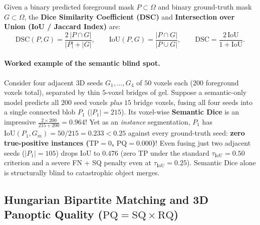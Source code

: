 \documentclass[10pt,a4paper]{article}
\renewcommand{\_}{\origunderscore\allowbreak}
\begin{document}
Given a binary predicted foreground mask $P \subset \Omega$ and binary ground-truth mask $G \subset \Omega$, the \textbf{Dice Similarity Coefficient (DSC)} and \textbf{Intersection over Union (IoU / Jaccard Index)} are:
\begin{equation}
    \text{DSC}(P, G) = \frac{2\,|P \cap G|}{|P| + |G|}, \qquad
    \text{IoU}(P, G) = \frac{|P \cap G|}{|P \cup G|}, \qquad
    \text{DSC} = \frac{2\,\text{IoU}}{1 + \text{IoU}}.
    \label{eq:dice_iou}
\end{equation}

\paragraph{Worked example of the semantic blind spot.} Consider four adjacent 3D seeds $G_1,\dots,G_4$ of $50$ voxels each ($200$ foreground voxels total), separated by thin $5$-voxel bridges of gel. Suppose a semantic-only model predicts all $200$ seed voxels \emph{plus} $15$ bridge voxels, fusing all four seeds into a single connected blob $P_1$ ($|P_1| = 215$). Its voxel-wise \textbf{Semantic Dice} is an impressive $\frac{2 \times 200}{215 + 200} = \mathbf{0.964}$! Yet as an \emph{instance} segmentation, $P_1$ has $\text{IoU}(P_1, G_m) = 50/215 = 0.233 < 0.25$ against every ground-truth seed: \textbf{zero true-positive instances ($\text{TP}=0$, $\text{PQ}=0.000$)}! Even fusing just two adjacent seeds ($|P_1|=105$) drops $\text{IoU}$ to $0.476$ (zero TP under the standard $\tau_{\text{IoU}}=0.50$ criterion and a severe FN + SQ penalty even at $\tau_{\text{IoU}}=0.25$). Semantic Dice alone is structurally blind to catastrophic object merges.

\subsection{Hungarian Bipartite Matching and 3D Panoptic Quality ($\text{PQ} = \text{SQ} \times \text{RQ}$)}
\end{document}
